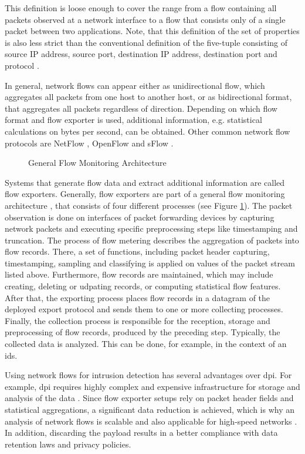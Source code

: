 This definition is loose enough to cover the range from a flow containing all packets observed at a network interface to a flow that consists only of a single packet between two applications. Note, that this definition of the set of properties is also less strict than the conventional definition of the five-tuple consisting of source IP address, source port, destination IP address, destination port and protocol \cite{rfc5101}.

In general, network flows can appear either as unidirectional flow, which aggregates all packets from one host to another host, or as bidirectional format, that aggregates all packets regardless of direction. Depending on which flow format and flow exporter is used, additional information, e.g. statistical calculations on bytes per second, can be obtained. Other common network flow protocols are NetFlow \cite{rfc3954}, OpenFlow \cite{mck_2008} and sFlow \cite{pha_2004}.

\begin{figure}[t]
    \centering
    
    \caption{General Flow Monitoring Architecture}
    \label{fig:flow-export}
\end{figure}


Systems that generate flow data and extract additional information are called flow exporters. Generally, flow exporters are part of a general flow monitoring architecture \cite{hof_2014}, that consists of four different processes (see Figure \ref{fig:flow-export}). The packet observation is done on interfaces of packet forwarding devices by capturing network packets and executing specific preprocessing steps like timestamping and truncation. The process of flow metering describes the aggregation of packets into flow records. There, a set of functions, including packet header capturing, timestamping, sampling and classifying is applied on values of the packet stream listed above. Furthermore, flow records are  maintained, which may include creating, deleting or udpating records, or computing statistical flow features. After that, the exporting process places flow records in a datagram of the deployed export protocol and sends them to one or more collecting processes. Finally, the collection process is responsible for the reception, storage and preprocessing of flow records, produced by the preceding step. Typically, the collected data is analyzed. This can be done, for example, in the context of an \gls{ids}.

Using network flows for intrusion detection has several advantages over \gls{dpi}. For example, \gls{dpi} requires highly complex and expensive infrastructure for storage and analysis of the data \cite{hof_2014}. Since flow exporter setups rely on packet header fields and statistical aggregations, a significant data reduction is achieved, which is why an analysis of network flows is scalable and also applicable for high-speed networks \cite{hof_2014}. In addition, discarding the payload results in a better compliance with data retention laws and privacy policies.